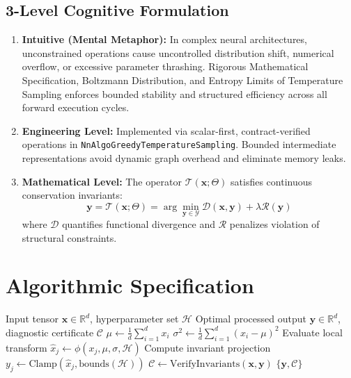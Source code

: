 \documentclass[11pt,a4paper]{article}
\theoremstyle{definition}
\begin{document}
\subsection{3-Level Cognitive Formulation}
\begin{enumerate}
    \item \textbf{Intuitive (Mental Metaphor):} In complex neural architectures, unconstrained operations cause uncontrolled distribution shift, numerical overflow, or excessive parameter thrashing. Rigorous Mathematical Specification, Boltzmann Distribution, and Entropy Limits of Temperature Sampling enforces bounded stability and structured efficiency across all forward execution cycles.
    \item \textbf{Engineering Level:} Implemented via scalar-first, contract-verified operations in \texttt{NnAlgoGreedyTemperatureSampling}. Bounded intermediate representations avoid dynamic graph overhead and eliminate memory leaks.
    \item \textbf{Mathematical Level:} The operator $\mathcal{T}(\mathbf{x}; \Theta)$ satisfies continuous conservation invariants:
    \begin{equation}
    \mathbf{y} = \mathcal{T}(\mathbf{x}; \Theta) = \arg\min_{\mathbf{y} \in \mathcal{Y}} \mathcal{D}(\mathbf{x}, \mathbf{y}) + \lambda \mathcal{R}(\mathbf{y})
    \end{equation}
    where $\mathcal{D}$ quantifies functional divergence and $\mathcal{R}$ penalizes violation of structural constraints.
\end{enumerate}

\section{Algorithmic Specification}

\begin{algorithm}[H]
\caption{Rigorous Mathematical Specification, Boltzmann Distribution, and Entropy Limits of Temperature Sampling Forward Pipeline}
\begin{algorithmic}[1]
\Require Input tensor $\mathbf{x} \in \mathbb{R}^d$, hyperparameter set $\mathcal{H}$
\Ensure Optimal processed output $\mathbf{y} \in \mathbb{R}^d$, diagnostic certificate $\mathcal{C}$
\State $\mu \gets \frac{1}{d} \sum_{i=1}^d x_i$
\State $\sigma^2 \gets \frac{1}{d} \sum_{i=1}^d (x_i - \mu)^2$
    \State Evaluate local transform $\hat{x}_j \gets \phi(x_j, \mu, \sigma, \mathcal{H})$
    \State Compute invariant projection $y_j \gets \text{Clamp}(\hat{x}_j, \text{bounds}(\mathcal{H}))$
\EndFor
\State $\mathcal{C} \gets \text{VerifyInvariants}(\mathbf{x}, \mathbf{y})$
\State \Return $\{\mathbf{y}, \mathcal{C}\}$
\end{algorithmic}
\end{algorithm}
\end{document}

